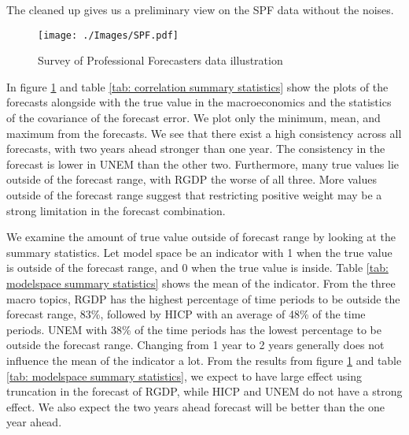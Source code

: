\documentclass[11pt]{article}
\begin{document}
The cleaned up gives us a preliminary view on the SPF data without the
noises.

\begin{figure}[!h]
	\centering
	\texttt{[image: ./Images/SPF.pdf]}
	\caption{Survey of Professional Forecasters data illustration}\label{fig: SPF data illustration}
\end{figure}

In figure \ref{fig: SPF data illustration} and table
\ref{tab: correlation summary statistics} show the plots of the
forecasts alongside with the true value in the macroeconomics and the
statistics of the covariance of the forecast error. We plot only the minimum,
mean, and maximum from the forecasts. We see that there exist a high
consistency across all forecasts, with two years ahead stronger than one
year. The consistency in the forecast is lower in UNEM than the other
two. Furthermore, many true values lie outside of the forecast range,
with RGDP the worse of all three. More values outside of the forecast
range suggest that restricting positive weight may be a strong
limitation in the forecast combination.

We examine the amount of true value outside of forecast range by
looking at the summary statistics. Let model space be an indicator with 1
when the true value is outside of the forecast range, and 0 when the
true value is inside. Table \ref{tab: modelspace summary statistics}
shows the mean of the indicator. From the three macro topics, RGDP has the highest percentage of time periods to be outside the forecast range, 83\%, followed by HICP
with an average of 48\% of the time periods. UNEM with 38\% of the time periods has the lowest percentage to be outside the forecast
range. Changing from 1 year to 2 years generally does not influence the
mean of the indicator a lot. From the results from figure
\ref{fig: SPF data illustration} and table
\ref{tab: modelspace summary statistics}, we expect to have large effect
using truncation in the forecast of RGDP, while HICP and UNEM do not
have a strong effect. We also expect the two years ahead forecast will
be better than the one year ahead.
\end{document}
